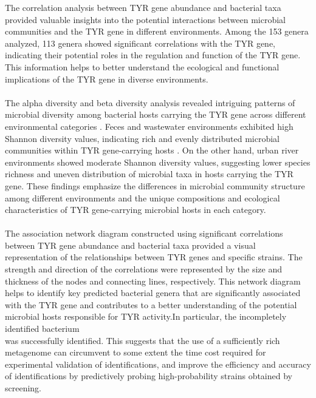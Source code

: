 \documentclass[12pt]{article}
\begin{document}
The correlation analysis between TYR gene abundance and bacterial taxa provided valuable insights into the potential interactions between microbial communities and the TYR gene in different environments. Among the 153 genera analyzed, 113 genera showed significant correlations with the TYR gene, indicating their potential roles in the regulation and function of the TYR gene. This information helps to better understand the ecological and functional implications of the TYR gene in diverse environments.\\\\
The alpha diversity and beta diversity analysis revealed intriguing patterns of microbial diversity among bacterial hosts carrying the TYR gene across different environmental categories \citep{socolar2016should}. Feces and wastewater environments exhibited high Shannon diversity values, indicating rich and evenly distributed microbial communities within TYR gene-carrying hosts \citep{thukral2017review}. On the other hand, urban river environments showed moderate Shannon diversity values, suggesting lower species richness and uneven distribution of microbial taxa in hosts carrying the TYR gene. These findings emphasize the differences in microbial community structure among different environments and the unique compositions and ecological characteristics of TYR gene-carrying microbial hosts in each category.\\\\
The association network diagram constructed using significant correlations between TYR gene abundance and bacterial taxa provided a visual representation of the relationships between TYR genes and specific strains. The strength and direction of the correlations were represented by the size and thickness of the nodes and connecting lines, respectively. This network diagram helps to identify key predicted bacterial genera that are significantly associated with the TYR gene and contributes to a better understanding of the potential microbial hosts responsible for TYR activity.In particular, the incompletely identified bacterium \\
 was successfully identified. This suggests that the use of a sufficiently rich metagenome can circumvent to some extent the time cost required for experimental validation of identifications, and improve the efficiency and accuracy of identifications by predictively probing high-probability strains obtained by screening.\\\\
\end{document}
